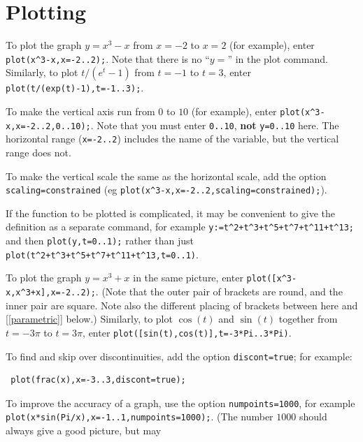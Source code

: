 \documentclass{amsart}
\begin{document}
\section{Plotting}


\begin{secenum}
%
 \item\label{basicplot} To plot the graph $y=x^3-x$ from $x=-2$ to $x=2$ (for
  example), enter \verb~plot(x^3-x,x=-2..2);~.  Note that
  there is no ``$y=$'' in the plot command.  Similarly, to
  plot $t/(e^t-1)$ from $t=-1$ to $t=3$, enter
  \verb~plot(t/(exp(t)-1),t=-1..3);~. 
%
 \item\label{vertrange} To make the vertical axis run from $0$ to $10$ (for
  example), enter \verb~plot(x^3-x,x=-2..2,0..10);~.  Note
  that you must enter \verb~0..10~, \textbf{not}
  \verb~y=0..10~ here.  The horizontal range
  (\verb~x=-2..2~) includes the name of the variable, but
  the vertical range does not. 
%
 \item\label{scaling} To make the vertical scale the same as the horizontal
  scale, add the option \verb~scaling=constrained~ (eg
  \verb~plot(x^3-x,x=-2..2,scaling=constrained);~). 
%
 \item\label{plotpredef} If the function to be plotted is
  complicated, it may be convenient to give the definition
  as a separate command, for example
  \verb~y:=t^2+t^3+t^5+t^7+t^11+t^13;~ and then
  \verb~plot(y,t=0..1);~ rather than just\\
  \verb~plot(t^2+t^3+t^5+t^7+t^11+t^13,t=0..1)~. 
%
 \item\label{twoplots} To plot the graph $y=x^3+x$ in the same picture, enter
  \verb~plot([x^3-x,x^3+x],x=-2..2);~.  (Note that the outer
  pair of brackets are round, and the inner pair are
  square.  Note also the different placing of brackets
  between here and [\ref{parametric}] below.)  Similarly,
  to plot $\cos(t)$ and $\sin(t)$ 
  together from $t=-3\pi$ to $t=3\pi$, enter
  \verb~plot([sin(t),cos(t)],t=-3*Pi..3*Pi)~. 
%
 \item\label{discont} To find and skip over discontinuities, add the option
  \verb~discont=true~; for example:
\begin{verbatim}
 plot(frac(x),x=-3..3,discont=true);
\end{verbatim}
%
 \item\label{numpoints} To improve the accuracy of a graph, use the option
  \verb~numpoints=1000~, for example\\
  \verb~plot(x*sin(Pi/x),x=-1..1,numpoints=1000);~.  (The
  number $1000$ should always give a good picture, but may

\end{secenum}
\end{document}

